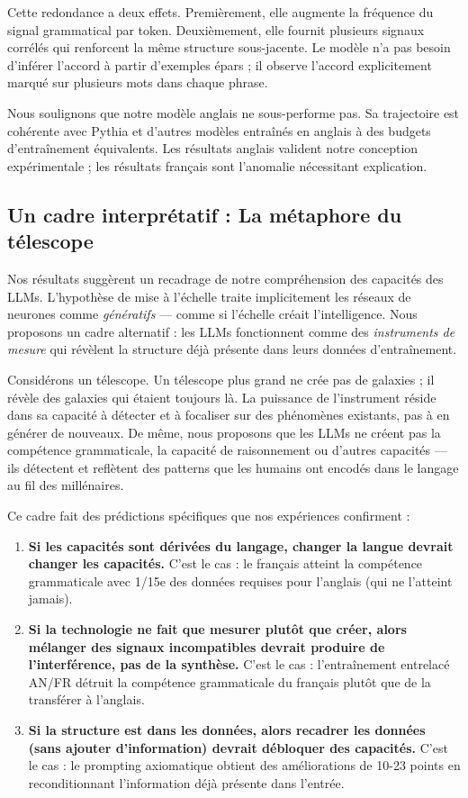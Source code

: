 \documentclass[11pt,a4paper]{article}
\begin{document}
Cette redondance a deux effets. Premièrement, elle augmente la fréquence du signal grammatical par token. Deuxièmement, elle fournit plusieurs signaux corrélés qui renforcent la même structure sous-jacente. Le modèle n'a pas besoin d'inférer l'accord à partir d'exemples épars ; il observe l'accord explicitement marqué sur plusieurs mots dans chaque phrase.

Nous soulignons que notre modèle anglais ne sous-performe pas. Sa trajectoire est cohérente avec Pythia et d'autres modèles entraînés en anglais à des budgets d'entraînement équivalents. Les résultats anglais valident notre conception expérimentale ; les résultats français sont l'anomalie nécessitant explication.

\subsection{Un cadre interprétatif : La métaphore du télescope}

Nos résultats suggèrent un recadrage de notre compréhension des capacités des LLMs. L'hypothèse de mise à l'échelle traite implicitement les réseaux de neurones comme \textit{génératifs} --- comme si l'échelle créait l'intelligence. Nous proposons un cadre alternatif : les LLMs fonctionnent comme des \textit{instruments de mesure} qui révèlent la structure déjà présente dans leurs données d'entraînement.

Considérons un télescope. Un télescope plus grand ne crée pas de galaxies ; il révèle des galaxies qui étaient toujours là. La puissance de l'instrument réside dans sa capacité à détecter et à focaliser sur des phénomènes existants, pas à en générer de nouveaux. De même, nous proposons que les LLMs ne créent pas la compétence grammaticale, la capacité de raisonnement ou d'autres capacités --- ils détectent et reflètent des patterns que les humains ont encodés dans le langage au fil des millénaires.

Ce cadre fait des prédictions spécifiques que nos expériences confirment :

\begin{enumerate}
    \item \textbf{Si les capacités sont dérivées du langage, changer la langue devrait changer les capacités.} C'est le cas : le français atteint la compétence grammaticale avec 1/15e des données requises pour l'anglais (qui ne l'atteint jamais).

    \item \textbf{Si la technologie ne fait que mesurer plutôt que créer, alors mélanger des signaux incompatibles devrait produire de l'interférence, pas de la synthèse.} C'est le cas : l'entraînement entrelacé AN/FR détruit la compétence grammaticale du français plutôt que de la transférer à l'anglais.

    \item \textbf{Si la structure est dans les données, alors recadrer les données (sans ajouter d'information) devrait débloquer des capacités.} C'est le cas : le prompting axiomatique obtient des améliorations de 10-23 points en reconditionnant l'information déjà présente dans l'entrée.
\end{enumerate}
\end{document}
